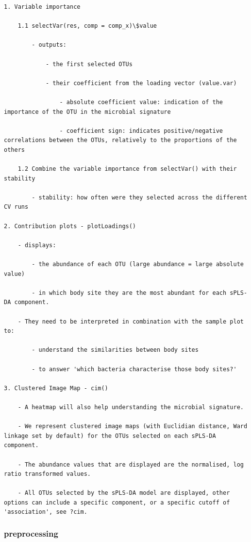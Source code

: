 \documentclass[
]{book}
\begin{document}
\begin{verbatim}
1. Variable importance

    1.1 selectVar(res, comp = comp_x)\$value

        - outputs:

            - the first selected OTUs

            - their coefficient from the loading vector (value.var)

                - absolute coefficient value: indication of the importance of the OTU in the microbial signature

                - coefficient sign: indicates positive/negative correlations between the OTUs, relatively to the proportions of the others

    1.2 Combine the variable importance from selectVar() with their stability

        - stability: how often were they selected across the different CV runs

2. Contribution plots - plotLoadings()

    - displays:

        - the abundance of each OTU (large abundance = large absolute value)

        - in which body site they are the most abundant for each sPLS-DA component.

    - They need to be interpreted in combination with the sample plot to:

        - understand the similarities between body sites

        - to answer 'which bacteria characterise those body sites?'

3. Clustered Image Map - cim()

    - A heatmap will also help understanding the microbial signature.

    - We represent clustered image maps (with Euclidian distance, Ward linkage set by default) for the OTUs selected on each sPLS-DA component.

    - The abundance values that are displayed are the normalised, log ratio transformed values.

    - All OTUs selected by the sPLS-DA model are displayed, other options can include a specific component, or a specific cutoff of 'association', see ?cim.
\end{verbatim}

\hypertarget{preprocessing}{%
\subsubsection{preprocessing}\label{preprocessing}}
\end{document}
